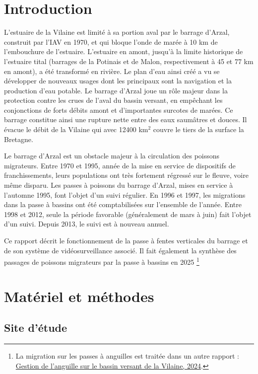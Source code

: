 \documentclass[11pt,twocolumn,titlepage,twoside]{article}\usepackage[]{graphicx}\usepackage[]{xcolor}
\begin{document}
\section*{Introduction}
\label{Introduction}
L'estuaire de la Vilaine est limité à sa portion aval par le barrage d'Arzal,
construit par l'IAV en 1970, et qui bloque l'onde de marée à 10 km de
l'embouchure de l'estuaire.
L'estuaire en amont, jusqu'à la limite historique de l'estuaire tital (barrages
de la Potinais et de Malon, respectivement à 45 et 77 km en amont), a été
transformé en rivière.
Le plan d'eau ainsi créé a vu se développer de nouveaux usages dont les
principaux sont la navigation et la production d'eau potable.
Le barrage d'Arzal joue un rôle majeur dans la protection contre les crues
de l'aval du bassin versant, en empêchant les conjonctions de forts débits amont
et d'importantes surcotes de marées.
Ce barrage constitue ainsi une rupture nette entre des eaux saumâtres et douces. Il évacue le débit
de la Vilaine qui avec 12400 km$^2$ couvre le tiers de la surface la Bretagne.

Le barrage d'Arzal est un obstacle majeur à la circulation
des poissons migrateurs. Entre 1970 et 1995, année de la mise en service de dispositifs de franchissements,
leurs populations ont très fortement régressé sur le fleuve, voire même disparu.
Les passes à poissons du barrage d'Arzal, mises en service à l'automne 1995,
font l'objet d'un suivi régulier. En 1996 et 1997, les migrations dans la passe à bassins
ont été comptabilisées sur l'ensemble de l'année. Entre 1998 et 2012, seule la période favorable
(généralement de mars à juin) fait l'objet d'un suivi. Depuis 2013, le suivi est à nouveau annuel.


Ce rapport décrit le fonctionnement de la passe à fentes verticales du barrage
et de son système de vidéosurveillance associé. Il fait également la synthèse des passages de
poissons migrateurs par la passe à bassins en 2025 
\footnote{La migration sur les passes à anguilles est traitée dans un autre
rapport :
\href{https://eptbvilaine56.sharepoint.com/:b:/g/extranet/IQByFprhrt2pTowh53k53SD6ASxL7ibVFXkpiAGLdeZ91LI?e=d4jCE3}{Gestion
de l'anguille sur le bassin versant de la Vilaine, 2024}.}



\section{Matériel et méthodes}

\subsection{Site d'étude}
\end{document}
